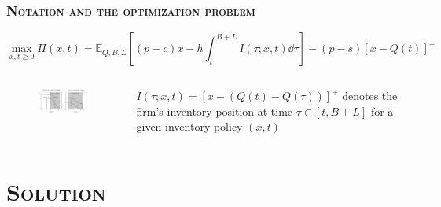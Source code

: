 \documentclass[aspectratio=169]{../presentation}
\begin{document}
    \begin{frame}
        \frametitle{\textsc{Notation and the optimization problem}}

        \begin{equation}
            \max _{x, t\geq 0}\Pi(x, t) = \mathbb E_{Q, B, L} \left[(p-c)x - h\int_{t}^{B+L} I(\tau; x, t)\dd \tau\right] - (p - s)\left[x - Q(t)\right]^+
        \end{equation}

        \begin{columns}
            \begin{column}{0.6\linewidth}
                \begin{figure}
                    \centering
                    \includegraphics[width=7.5cm]{imgs/gp01-1.png}
                \end{figure}
            \end{column}
            \begin{column}{0.35\linewidth}
                $I(\tau; x, t) = \left[x - (Q(t) - Q(\tau))\right]^+$ denotes the firm's inventory position at time $\tau\in [t, B+L]$ for a given inventory policy $(x, t)$
            \end{column}
        \end{columns}

    \end{frame}

    \section{\textsc{Solution}}
\end{document}
